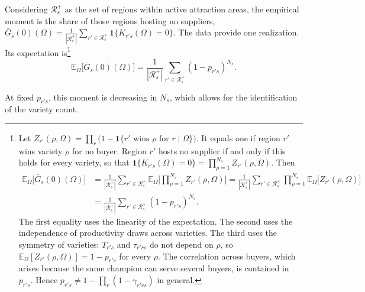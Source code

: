 Considering $\mathcal{R}^{+}_{s}$ as the set of regions within active attraction areas, the empirical moment is the share of those regions hosting no suppliers, $\bar G_{s}(0)(\Omega)=\frac{1}{|\mathcal{R}^{+}_{s}|}\sum_{r'\in\mathcal{R}^{+}_{s}}\mathbf{1}\{K_{r's}(\Omega)=0\}$. The data provide one realization. Its expectation is\footnote{Let $Z_{r'}(\rho,\Omega)=\prod_r\big(1-\mathbf{1}\{r' \text{ wins } \rho \text{ for } r \mid \Omega\}\big)$. It equals one if region $r'$ wins variety $\rho$ for no buyer. Region $r'$ hosts no supplier if and only if this holds for every variety, so that $\mathbf{1}\{K_{r's}(\Omega)=0\}=\prod_{\rho=1}^{N_s} Z_{r'}(\rho,\Omega)$. Then
\begin{align*}
\mathbb{E}_\Omega\big[\bar G_{s}(0)(\Omega)\big]
&=\frac{1}{|\mathcal{R}^{+}_{s}|}\sum_{r'\in\mathcal{R}^{+}_{s}}\mathbb{E}_\Omega\Big[\prod_{\rho=1}^{N_s} Z_{r'}(\rho,\Omega)\Big]
=\frac{1}{|\mathcal{R}^{+}_{s}|}\sum_{r'\in\mathcal{R}^{+}_{s}}\prod_{\rho=1}^{N_s}\mathbb{E}_\Omega\big[Z_{r'}(\rho,\Omega)\big] \\
&=\frac{1}{|\mathcal{R}^{+}_{s}|}\sum_{r'\in\mathcal{R}^{+}_{s}}(1-p_{r's})^{N_{s}}.
\end{align*}
The first equality uses the linearity of the expectation. The second uses the independence of productivity draws across varieties. The third uses the symmetry of varieties: $T_{r's}$ and $\tau_{r'rs}$ do not depend on $\rho$, so $\mathbb{E}_\Omega[Z_{r'}(\rho,\Omega)]=1-p_{r's}$ for every $\rho$. The correlation across buyers, which arises because the same champion can serve several buyers, is contained in $p_{r's}$. Hence $p_{r's}\neq 1-\prod_r(1-\gamma_{r'rs})$ in general.}
\begin{equation}
\mathbb{E}_\Omega\big[\bar G_{s}(0)(\Omega)\big]=\frac{1}{|\mathcal{R}^{+}_{s}|}\sum_{r'\in\mathcal{R}^{+}_{s}}(1-p_{r's})^{N_{s}}.
\label{eq:app-count}
\end{equation}
 
At fixed $p_{r's}$, this moment is decreasing in $N_s$, which allows for the identification of the variety count. \\
 
